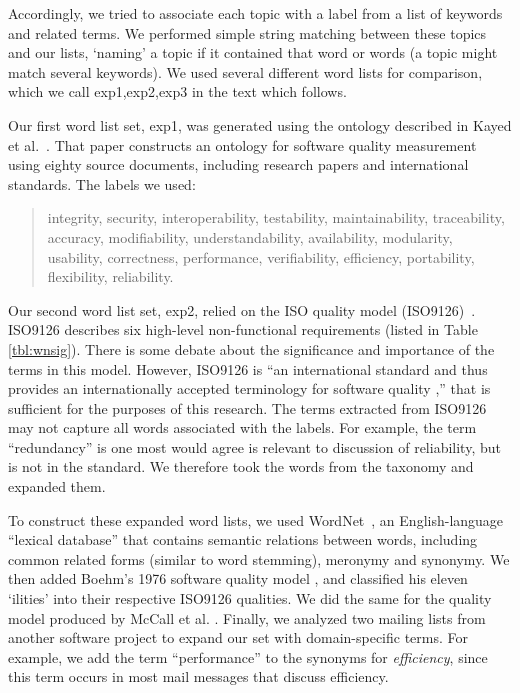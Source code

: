 \documentclass[]{sig-alternate}
\begin{document}
Accordingly, we tried to associate each topic with a label from a list of keywords and related terms. We performed simple string matching between these topics and our lists, `naming' a topic if it contained that word or words (a topic might match several keywords). We used several different word lists for comparison, which we call \textsf{exp1,exp2,exp3} in the text which follows. 

Our first word list set, \textsf{exp1}, was generated using the ontology described in Kayed et al.~\cite{5072519}. That paper constructs an ontology for software quality measurement using eighty source documents, including research papers and international standards. The labels we used:
\begin{quotation}
\small \noindent \textsf{
integrity, security,
interoperability, testability, maintainability, traceability,
accuracy, modifiability, understandability, availability, modularity,
usability, correctness, performance, verifiability, efficiency,
portability, flexibility, reliability.
}
\end{quotation}

Our second word list set, \textsf{exp2}, relied on the ISO quality model (ISO9126)~\cite{iso9126}. ISO9126 describes six high-level non-functional requirements (listed in Table \ref{tbl:wnsig}). There is some debate about the significance and importance of the terms in this model. However, ISO9126 is ``an international standard and thus provides an internationally accepted terminology for software quality \cite[p. 58]{Boegh2008},'' that is sufficient for the purposes of this research. The terms extracted from ISO9126 may not capture all words associated with the labels.  For example, the term ``redundancy'' is one most would agree is relevant to discussion of reliability, but is not in the standard. We therefore took the words from the taxonomy and expanded them.

To construct these expanded word lists, we used WordNet~\cite{Fellbaum1998}, an English-language ``lexical database'' that contains semantic relations between words, including common related forms (similar to word stemming), meronymy and synonymy. We then added Boehm's 1976 software quality model \cite{Boehm+:1976:ICSE}, and classified his eleven `ilities' into their respective ISO9126 qualities. We did the same for the quality model produced by McCall et al. \cite{mccall1977}. Finally, we analyzed two mailing lists from another software project to expand our set with domain-specific terms. For example, we add the term ``performance'' to the synonyms for \emph{efficiency}, since this term occurs in most mail messages that discuss efficiency.
\end{document}
